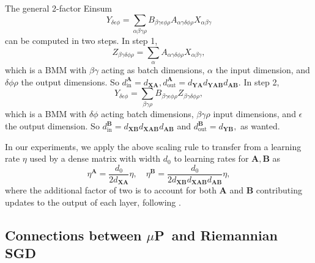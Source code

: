 \documentclass{article}
\newcommand{\mbf}[1]{{\boldsymbol{\mathbf{#1}}}}
\newcommand{\bm}{\mbf}
\newcommand{\mup}{$\mu$P}
\begin{document}
The general 2-factor Einsum
\begin{equation}
      Y_{\delta \epsilon \phi}
      =
      \sum_{\alpha \beta \gamma \rho}
         B_{\beta \gamma \epsilon \phi \rho} A_{\alpha \gamma \delta \phi \rho} X_{\alpha \beta \gamma}
 \end{equation}
 can be computed in two steps. In step 1,
 \begin{equation}
      Z_{\beta \gamma \delta \phi \rho}
      = \sum_{\alpha} A_{\alpha \gamma \delta \phi \rho} X_{\alpha \beta \gamma},
 \end{equation}
 which is a BMM with $\beta\gamma$ acting as batch dimensions, $\alpha$ the input dimension, and $\delta\phi\rho$ the output dimensions. So $d_{\text{in}}^{\bm{A}} = d_{\bm{X}\bm{A}},
d_{\text{out}}^{\bm{A}} = d_{\bm{Y}\bm{A}} d_{\bm{Y} \bm{A} \bm{B}} d_{\bm{A}\bm{B}}.$ In step 2,
\begin{equation}
      Y_{\delta \epsilon \phi}
      = \sum_{\beta \gamma \rho} B_{\beta \gamma \epsilon \phi \rho} Z_{\beta \gamma \delta \phi \rho},
 \end{equation}
 which is a BMM with $\delta\phi$ acting batch dimensions, $\beta\gamma\rho$ input dimensions, and $\epsilon$ the output dimension. So $d_{\text{in}}^{\bm{B}} = d_{\bm{X} \bm{B}} d_{\bm{X} \bm{A} \bm{B}} d_{\bm{A} \bm{B}}$ and $d_{\text{out}}^{\bm{B}} = d_{\bm{Y}\bm{B}},$ as wanted.

 In our experiments, we apply the above scaling rule to transfer from a learning rate $\eta$ used by a dense matrix with width $d_0$ to learning rates for $\bm{A}, \bm{B}$ as
 \begin{equation}
     \eta^{\bm{A}} = \frac{d_0}{2d_{\bm{X} \bm{A}}}\eta,\quad \eta^{\bm{B}} = \frac{d_0}{2d_{\bm{X} \bm{B}} d_{\bm{X} \bm{A} \bm{B}} d_{\bm{A} \bm{B}}}\eta,
 \end{equation}
 where the additional factor of two is to account for both $\bm{A}$ and $\bm{B}$ contributing updates to the output of each layer, following \citet{qiu2024compute}.

\subsection{Connections between \mup\ and Riemannian SGD}
\end{document}
